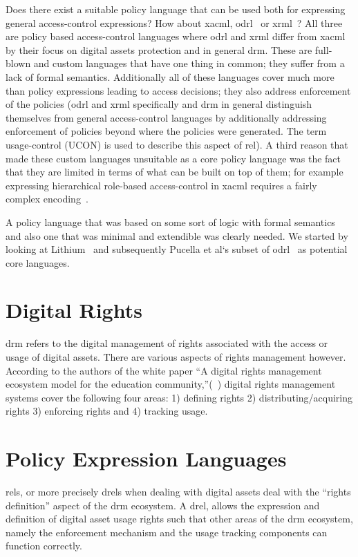 Does there exist a suitable policy language that can be used both for expressing general access-control expressions? How about \ac{xacml}, \ac{odrl}~\cite{odrloneone} or \ac{xrml}~\cite{Wang}? All three are policy based access-control languages where \ac{odrl} and \ac{xrml} differ from \ac{xacml} by their focus on digital assets protection and in general \ac{drm}. These are full-blown and custom languages that have one thing in common; they suffer from a lack of formal semantics. Additionally all of these languages cover much more than policy expressions leading to access decisions; they also address enforcement of the policies (\ac{odrl} and \ac{xrml} specifically and \ac{drm} in general distinguish themselves from general access-control languages by additionally addressing enforcement of policies beyond where the policies were generated. The term usage-control (UCON) is used to describe this aspect of \ac{rel}). A third reason that made these custom languages unsuitable as a core policy language was the fact that they are limited in terms of what can be built on top of them; for example expressing hierarchical role-based access-control  in \ac{xacml} requires a fairly complex encoding~\cite{Tschantz}.

A policy language that was based on some sort of logic with formal semantics and also one that was minimal and extendible was clearly needed. We started by looking at Lithium~\cite{Halpern2008} and subsequently Pucella et al`s subset of \ac{odrl}~\cite{pucella2006} as potential core languages. 

\section{Digital Rights} 

\ac{drm} refers to the digital management of rights associated with the access or usage of digital assets. There are various aspects of rights management however. According to the authors of the white paper ``A digital rights management ecosystem model for the education community,''(~\cite{collier})
 digital rights management systems cover the following four areas: 1) defining rights 2) distributing/acquiring rights 3) enforcing rights and 4) tracking usage.

\section{Policy Expression Languages}

\ac{rel}s, or more precisely \ac{drel}s when dealing with digital assets deal with the ``rights definition'' aspect of the \ac{drm} ecosystem. A \ac{drel}, allows the expression and definition of digital asset usage rights such that other areas of the \ac{drm} ecosystem, namely the enforcement mechanism and the usage tracking components can function correctly.

